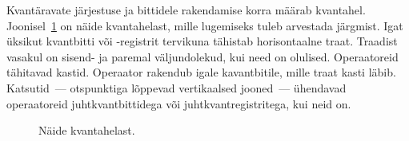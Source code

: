 \documentclass[12pt]{report}
\def\ket#1{\left|#1\right>}
\def\SWAP{\mathop{\rm SWAP}\nolimits}
\begin{document}
\begin{table}[]
    \caption{Töös kasutatud operaatorid, nende definitsioonid maatriksitena ja tähistused ahelas.}
    \label{tab:gates}
\end{table}

Kvantäravate järjestuse ja bittidele rakendamise korra määrab kvantahel.
Joonisel~\ref{fig:circuits} on näide kvantahelast, mille lugemiseks tuleb arvestada järgmist.
Igat üksikut kvantbitti või -registrit tervikuna tähistab horisontaalne traat.
Traadist vasakul on sisend- ja paremal väljundolekud, kui need on olulised.
Operaatoreid tähitavad kastid.
Operaator rakendub igale kavantbitile, mille traat kasti läbib.
Katsutid~--- otspunktiga lõppevad vertikaalsed jooned~--- ühendavad operaatoreid juhtkvantbittidega või juhtkvantregistritega, kui neid on.

\begin{figure}
    \centering
    \ifdefined\yquanton
    \fi
    \caption{Näide kvantahelast.}
    \label{fig:circuits}
\end{figure}
\end{document}

